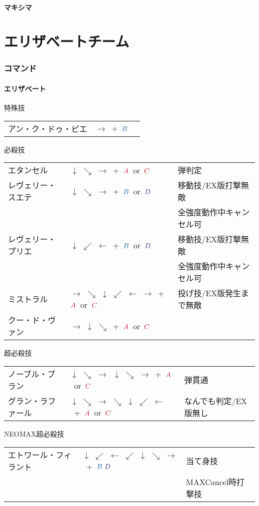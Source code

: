 \documentclass[a4j,11pt]{jarticle}
\def\A{\textcolor{Acolor}{A}}
\def\C{\textcolor{Ccolor}{C}}
\def\B{\textcolor{Bcolor}{B}}
\def\D{\textcolor{Dcolor}{D}}
\def\hado{$\downarrow$ $\searrow$ $\rightarrow$}%
\def\tatsu{$\downarrow$ $\swarrow$ $\leftarrow$}%
\def\syoryu{$\rightarrow$ $\downarrow$ $\searrow$}%
\def\tenti{$\rightarrow$ $\searrow$ $\downarrow$ $\swarrow$ $\leftarrow$ $\rightarrow$}%
\def\ryuko{$\downarrow$ $\searrow$ $\rightarrow$ $\searrow$ $\downarrow$ $\swarrow$ $\leftarrow$}%
\def\orochi{$\downarrow$ $\swarrow$ $\leftarrow$ $\swarrow$ $\downarrow$ $\searrow$ $\rightarrow$}%
\begin{document}
\subsection{マキシマ}
\newpage
\part{エリザベートチーム}%
\section{コマンド}
\subsection{エリザベート}
\begin{itembox}[l]{特殊技}
\begin{tabular}{lll}
アン・ク・ドゥ・ピエ&$\rightarrow$\ +\ $\B$&%
\end{tabular}
\end{itembox}
\begin{itembox}[l]{必殺技}
\begin{tabular}{lll}
エタンセル&\hado\ +\ $\A$\ or\ $\C$&弾判定\\%
レヴェリー・スエテ&\hado\ +\ $\B$\ or\ $\D$&移動技/EX版打撃無敵\\%
&&全強度動作中キャンセル可\\
レヴェリー・プリエ&\tatsu\ +\ $\B$\ or\ $\D$&移動技/EX版打撃無敵\\%
&&全強度動作中キャンセル可\\
ミストラル&\tenti\ +\ $\A$\ or\ $\C$&投げ技/EX版発生まで無敵\\%
クー・ド・ヴァン&\syoryu\ +\ $\A$\ or\ $\C$&%
\end{tabular}
\end{itembox}
\begin{itembox}[l]{超必殺技}
\begin{tabular}{lll}
ノーブル・ブラン&\hado\ \hado\ +\ $\A$\ or\ $\C$&弾貫通\\%
グラン・ラファール&\ryuko\ +\ $\A$\ or\ $\C$&なんでも判定/EX版無し%
\end{tabular}
\end{itembox}
\begin{itembox}[l]{NEOMAX超必殺技}
\begin{tabular}{lll}
エトワール・フィラント&\orochi\ +\ $\B\ \D$&当て身技\\%
&&MAXCancel時打撃技
\end{tabular}
\end{itembox}
\newpage
\end{document}
